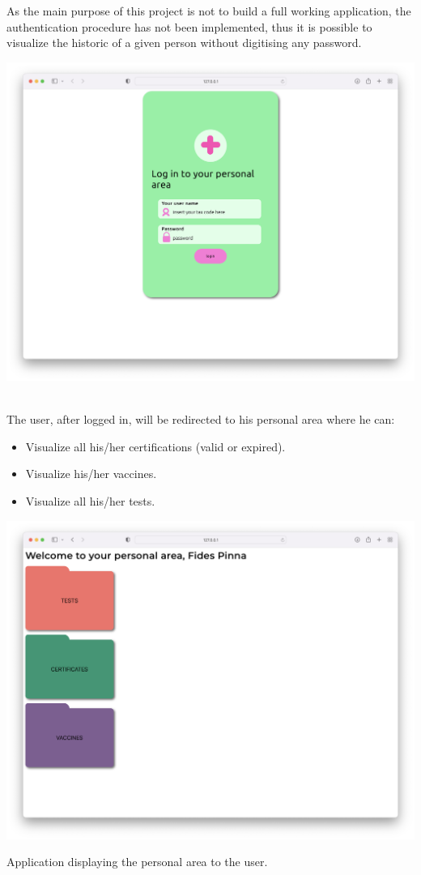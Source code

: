 \documentclass{article}
\begin{document}
As the main purpose of this project is not to build a full working application, the authentication procedure has not been implemented, thus it is possible to visualize the historic of a given person without
digitising any password.
\hfill\break
\hfill\break

\begin{center}
\includegraphics[scale=0.23]{login.png}
\end{center}
\hfill\break
\hfill\break
\\The user, after logged in, will be redirected to his personal area where he can:
\begin{itemize}
    \item Visualize all his/her certifications (valid or expired).
    \item Visualize his/her vaccines.
    \item Visualize all his/her tests.
\end{itemize}
\begin{center}
\includegraphics[scale=0.23]{home.png}
    \caption{Application displaying the personal area to the user.}

\end{center}
\end{document}
